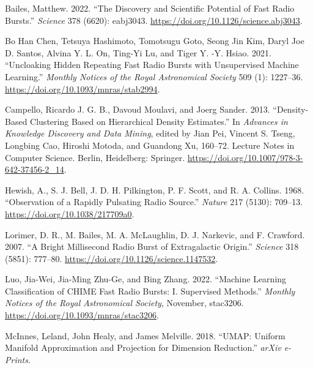 \documentclass[
  letterpaper,
  DIV=11,
  numbers=noendperiod]{scrreport}
\newlength{\cslhangindent}
\newlength{\cslentryspacingunit} %
\newenvironment{CSLReferences}[2] %
 {%
  \setlength{\parindent}{0pt}
  \ifodd #1
  \let\oldpar\par
  \def\par{\hangindent=\cslhangindent\oldpar}
  \fi
  \setlength{\parskip}{#2\cslentryspacingunit}
 }%
 {}
\begin{document}
\hypertarget{refs}{}
\begin{CSLReferences}{1}{0}
\leavevmode{}%
Bailes, Matthew. 2022. {``The Discovery and Scientific Potential of Fast
Radio Bursts.''} \emph{Science} 378 (6620): eabj3043.
\url{https://doi.org/10.1126/science.abj3043}.

\leavevmode{}%
Bo Han Chen, Tetsuya Hashimoto, Tomotsugu Goto, Seong Jin Kim, Daryl Joe
D. Santos, Alvina Y. L. On, Ting-Yi Lu, and Tiger Y. -Y. Hsiao. 2021.
{``Uncloaking Hidden Repeating Fast Radio Bursts with Unsupervised
Machine Learning.''} \emph{Monthly Notices of the Royal Astronomical
Society} 509 (1): 1227--36.
\url{https://doi.org/10.1093/mnras/stab2994}.

\leavevmode{}%
Campello, Ricardo J. G. B., Davoud Moulavi, and Joerg Sander. 2013.
{``Density-{Based Clustering Based} on {Hierarchical Density
Estimates}.''} In \emph{Advances in {Knowledge Discovery} and {Data
Mining}}, edited by Jian Pei, Vincent S. Tseng, Longbing Cao, Hiroshi
Motoda, and Guandong Xu, 160--72. Lecture {Notes} in {Computer Science}.
{Berlin, Heidelberg}: {Springer}.
\url{https://doi.org/10.1007/978-3-642-37456-2_14}.

\leavevmode{}%
Hewish, A., S. J. Bell, J. D. H. Pilkington, P. F. Scott, and R. A.
Collins. 1968. {``Observation of a {Rapidly Pulsating Radio Source}.''}
\emph{Nature} 217 (5130): 709--13.
\url{https://doi.org/10.1038/217709a0}.

\leavevmode{}%
Lorimer, D. R., M. Bailes, M. A. McLaughlin, D. J. Narkevic, and F.
Crawford. 2007. {``A Bright Millisecond Radio Burst of Extragalactic
Origin.''} \emph{Science} 318 (5851): 777--80.
\url{https://doi.org/10.1126/science.1147532}.

\leavevmode{}%
Luo, Jia-Wei, Jia-Ming Zhu-Ge, and Bing Zhang. 2022. {``Machine Learning
Classification of {CHIME} Fast Radio Bursts: {I}. {Supervised
Methods}.''} \emph{Monthly Notices of the Royal Astronomical Society},
November, stac3206. \url{https://doi.org/10.1093/mnras/stac3206}.

\leavevmode{}%
McInnes, Leland, John Healy, and James Melville. 2018. {``{UMAP}:
{Uniform Manifold Approximation} and {Projection} for {Dimension
Reduction}.''} \emph{arXiv e-Prints}.


\end{CSLReferences}
\end{document}
